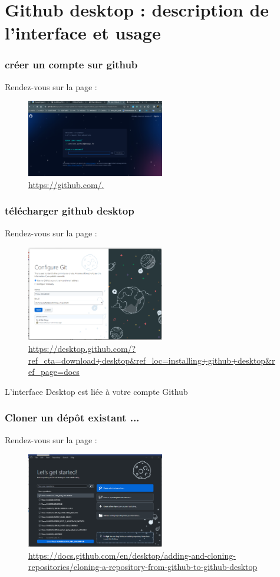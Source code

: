 \section{Github desktop : description de l'interface et usage}
\begin{frame}
  \frametitle{créer un compte sur github}

Rendez-vous sur la page : 
\begin{figure}
\caption{\url{https://github.com/.}}
  \includegraphics[width=6cm]{images/github_inscription.png}
  
  \end{figure}
  
\end{frame}

\begin{frame}
  \frametitle{télécharger github desktop}

Rendez-vous sur la page : 
\begin{figure}
\caption{\url{https://desktop.github.com/?ref_cta=download+desktop&ref_loc=installing+github+desktop&ref_page=docs}}
  \includegraphics[width=6cm]{images/github_desktop_connect.png}
  
  \end{figure}

 L'interface Desktop est liée à votre compte Github  
  
\end{frame}

\begin{frame}
  \frametitle{Cloner un dépôt existant ...}

Rendez-vous sur la page : 
\begin{figure}
\caption{\url{https://docs.github.com/en/desktop/adding-and-cloning-repositories/cloning-a-repository-from-github-to-github-desktop}}
  \includegraphics[width=6cm]{images/github_desktop_connect2.png}
  \end{figure}
  
\end{frame}

